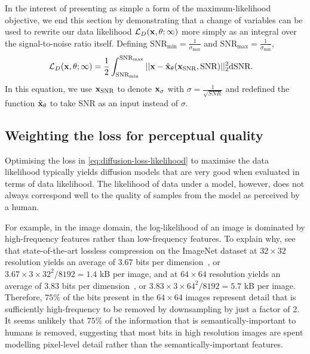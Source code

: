 In the interest of presenting as simple a form of the maximum-likelihood objective, we end this section by demonstrating that a change of variables can be used to rewrite our data likelihood $\mathcal{L}_D({\mathbf{x}}, \theta; \infty)$ more simply as an integral over the signal-to-noise ratio itself. Defining $\text{SNR}_\text{min} = \frac{1}{\sigma_\text{max}}$ and $\text{SNR}_\text{max} = \frac{1}{\sigma_\text{min}}$,
\begin{align}
    \mathcal{L}_D({\mathbf{x}}, \theta; \infty) &= \frac{1}{2} \int_{\text{SNR}_\text{min}}^{\text{SNR}_\text{max}} || {\mathbf{x}} - \hat{{\mathbf{x}}}_\theta({\mathbf{x}}_\text{SNR}, \text{SNR}) ||_2^2 \mathrm{d}\text{SNR}. \label{eq:diffusion-integral-dsnr}
\end{align}
In this equation, we use ${\mathbf{x}}_\text{SNR}$ to denote ${\mathbf{x}}_\sigma$ with $\sigma = \frac{1}{\sqrt{SNR}}$ and redefined the function $\hat{{\mathbf{x}}}_\theta$ to take $\text{SNR}$ as an input instead of $\sigma$.


\subsection{Weighting the loss for perceptual quality} \label{sec:diffusion-perceptual-quality}
Optimising the loss in \cref{eq:diffusion-loss-likelihood} to maximise the data likelihood typically yields diffusion models that are very good when evaluated in terms of data likelihood. The likelihood of data under a model, however, does not always correspond well to the quality of samples from the model as perceived by a human. 

For example, in the image domain, the log-likelihood of an image is dominated by high-frequency features rather than low-frequency features. To explain why, see that state-of-the-art lossless compression on the ImageNet dataset at $32\times32$ resolution yields an average of $3.67$ bits per dimension~\citep{sahoo2023diffusion}, or $3.67\times3\times32^2 / 8192 = 1.4$ kB per image, and at $64\times64$ resolution yields an average of 3.83 bits per dimension~\citep{finlay2020train}, or $3.83\times3\times64^2 / 8192 = 5.7$ kB per image. Therefore, $75\%$ of the bits present in the $64\times64$ images represent detail that is sufficiently high-frequency to be removed by downsampling by just a factor of 2. It seems unlikely that $75\%$ of the information that is semantically-important to humans is removed, suggesting that most bits in high resolution images are spent modelling pixel-level detail rather than the semantically-important features.

